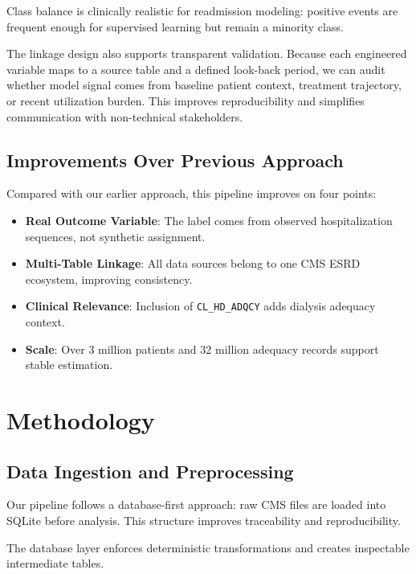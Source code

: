 \documentclass[conference]{IEEEtran}
\begin{document}
Class balance is clinically realistic for readmission modeling: positive events are frequent enough for supervised learning but remain a minority class.

The linkage design also supports transparent validation. Because each engineered variable maps to a source table and a defined look-back period, we can audit whether model signal comes from baseline patient context, treatment trajectory, or recent utilization burden. This improves reproducibility and simplifies communication with non-technical stakeholders.

\subsection{Improvements Over Previous Approach}
Compared with our earlier approach, this pipeline improves on four points:
\begin{itemize}
    \item \textbf{Real Outcome Variable}: The label comes from observed hospitalization sequences, not synthetic assignment.
    \item \textbf{Multi-Table Linkage}: All data sources belong to one CMS ESRD ecosystem, improving consistency.
    \item \textbf{Clinical Relevance}: Inclusion of \texttt{CL_HD_ADQCY} adds dialysis adequacy context.
    \item \textbf{Scale}: Over 3 million patients and 32 million adequacy records support stable estimation.
\end{itemize}

\section{Methodology}
\subsection{Data Ingestion and Preprocessing}
Our pipeline follows a database-first approach: raw CMS files are loaded into SQLite before analysis. This structure improves traceability and reproducibility.

The database layer enforces deterministic transformations and creates inspectable intermediate tables.
\end{document}
